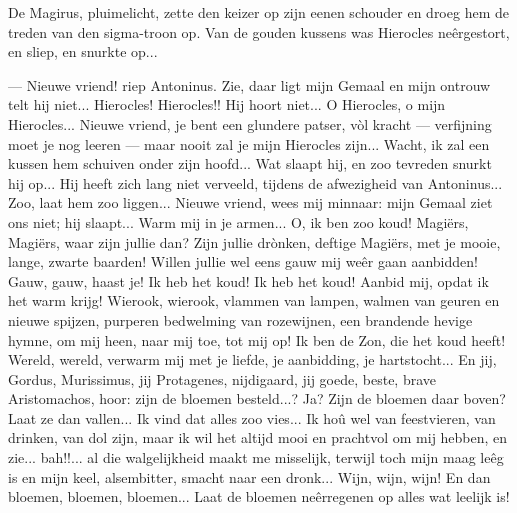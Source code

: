 \documentclass[a4paper, 12pt, oneside, dutch]{article}
\begin{document}
De Magirus, pluimelicht, zette den keizer op zijn eenen schouder en droeg hem de treden van den sigma-troon op. Van de gouden kussens was Hierocles neêrgestort, en sliep, en snurkte op...

--- Nieuwe vriend! riep Antoninus. Zie, daar ligt mijn Gemaal en mijn ontrouw telt hij niet... Hierocles! Hierocles!! Hij hoort niet... O Hierocles, o mijn Hierocles... Nieuwe vriend, je bent een glundere patser, vòl kracht --- verfijning moet je nog leeren --- maar nooit zal je mijn Hierocles zijn... Wacht, ik zal een kussen hem schuiven onder zijn hoofd... Wat slaapt hij, en zoo tevreden snurkt hij op... Hij heeft zich lang niet verveeld, tijdens de afwezigheid van Antoninus... Zoo, laat hem zoo liggen... Nieuwe vriend, wees mij minnaar: mijn Gemaal ziet ons niet; hij slaapt... Warm mij in je armen... O, ik ben zoo koud! Magiërs, Magiërs, waar zijn jullie dan? Zijn jullie drònken, deftige Magiërs, met je mooie, lange, zwarte baarden! Willen jullie wel eens gauw mij weêr gaan aanbidden! Gauw, gauw, haast je! Ik heb het koud! Ik heb het koud! Aanbid mij, opdat ik het warm krijg! Wierook, wierook, vlammen van lampen, walmen van geuren en nieuwe spijzen, purperen bedwelming van rozewijnen, een brandende hevige hymne, om mij heen, naar mij toe, tot mij op! Ik ben de Zon, die het koud heeft! Wereld, wereld, verwarm mij met je liefde, je aanbidding, je hartstocht... En jij, Gordus, Murissimus, jij Protagenes, nijdigaard, jij goede, beste, brave Aristomachos, hoor: zijn de bloemen besteld...? Ja? Zijn de bloemen daar boven? Laat ze dan vallen... Ik vind dat alles zoo vies... Ik hoû wel van feestvieren, van drinken, van dol zijn, maar ik wil het altijd mooi en prachtvol om mij hebben, en zie... bah!!... al die walgelijkheid maakt me misselijk, terwijl toch mijn maag leêg is en mijn keel, alsembitter, smacht naar een dronk... Wijn, wijn, wijn! En dan bloemen, bloemen, bloemen... Laat de bloemen neêrregenen op alles wat leelijk is!
\end{document}
